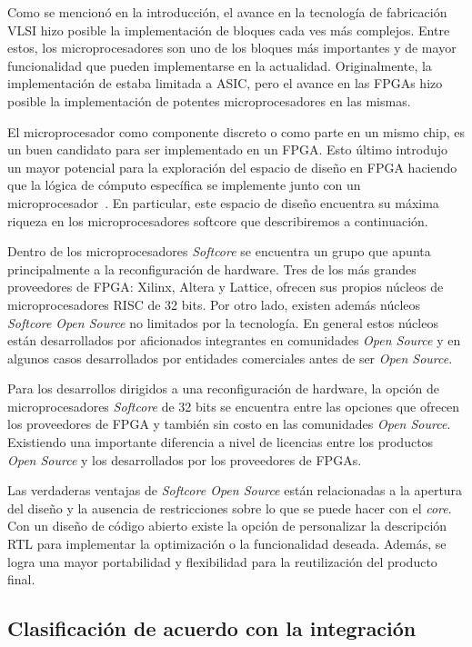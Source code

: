 Como se mencionó en la introducción, el avance en la tecnología de
fabricación VLSI hizo posible la implementación de bloques cada ves
más complejos. Entre estos, los microprocesadores son uno de los
bloques más importantes y de mayor funcionalidad que pueden
implementarse en la actualidad. Originalmente, la implementación de estaba limitada a ASIC, pero el avance en las FPGAs hizo
posible la implementación de potentes microprocesadores en las
mismas.

El microprocesador como componente discreto o como parte en un mismo 
chip, es un buen candidato para ser implementado en un FPGA. Esto último introdujo
 un mayor potencial para la exploración
del espacio de diseño en FPGA haciendo que la lógica de cómputo
específica se implemente junto con un
microprocesador~\cite{Etiqueta05}. En particular, este espacio de
diseño encuentra su máxima riqueza en los microprocesadores softcore
que describiremos a continuación.
	
Dentro de los microprocesadores \textit{Softcore} se encuentra un
grupo que apunta principalmente a la reconfiguración de hardware.
Tres de los más grandes proveedores de FPGA: Xilinx, Altera y Lattice,
ofrecen sus propios núcleos de microprocesadores RISC de 32 bits. Por
otro lado, existen además núcleos \textit{Softcore} \textit{Open
  Source} no limitados por la tecnología. En general estos núcleos están
desarrollados por aficionados integrantes en comunidades
\textit{Open Source} y en algunos casos desarrollados por
entidades comerciales antes de ser \textit{Open Source}.
	
Para los desarrollos dirigidos a una reconfiguración de hardware, la
opción de microprocesadores \textit{Softcore} de 32 bits se encuentra
entre las opciones que ofrecen los proveedores de FPGA y también sin costo en las comunidades \textit{Open Source}. Existiendo una importante diferencia a
nivel de licencias entre los productos \textit{Open Source} y los
desarrollados por los proveedores de FPGAs.

Las verdaderas ventajas de \textit{Softcore Open Source} están
relacionadas a la apertura del diseño y la ausencia de restricciones
sobre lo que se puede hacer con el \textit{core}. Con un diseño de
código abierto existe la opción de personalizar la descripción RTL
para implementar la optimización o la funcionalidad deseada. Además,
se logra una mayor portabilidad y flexibilidad para la
reutilización del producto final.


\subsection{Clasificación de acuerdo con la integración}

